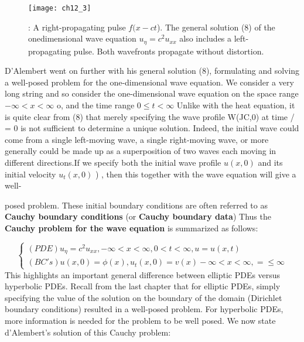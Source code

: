\documentclass[../main.tex]{subfiles}
\begin{document}
\begin{figure}[H]
	\centering
	\texttt{[image: ch12\_3]}
	\caption{\textsf{: A right-propagating pulse $f(x - ct$). The general solution (8) of the onedimensional wave equation $u_\eta = c^2 u_{xx}$
also includes a left-propagating pulse. Both
wavefronts propagate without distortion.}}
	\label{pfig:ch12_3}
\end{figure}

D'Alembert went on further with his general solution (8), formulating and
solving a well-posed problem for the one-dimensional wave equation. We
consider a very long string and so consider the one-dimensional wave equation on
the space range $ -\infty <x< \infty$ o, and the time range $ 0 \leqslant t < \infty $ 
Unlike with the heat
equation, it is quite clear from (8) that merely specifying the wave profile W(JC,0) at
time / = 0 is not sufficient to determine a unique solution. Indeed, the initial wave
could come from a single left-moving wave, a single right-moving wave, or more
generally could be made up as a superposition of two waves each moving in
different directions.If we specify both the initial wave profile $u(x,0)$ and its
initial velocity $u_t(x,0)$ ) , then this together with the wave equation will give a well-


posed problem. These initial boundary conditions are often referred to as \textbf{Cauchy
boundary conditions}  (or \textbf{Cauchy boundary data}) Thus the \textbf{Cauchy problem
for the wave equation} is summarized as follows: 

\begin{equation}
\left\{\begin{array}{ll}
(PDE) u_\eta=c^2u_{xx}, -\infty<x<\infty, 0<t<\infty, u=u(x,t)\\
(BC's) u(x,0)=\phi(x), u_t(x,0)=v(x)-\infty<x<\infty ,=\leqslant \infty
\end{array} \right.
\end{equation}
This highlights an important general difference between elliptic PDEs versus
hyperbolic PDEs. Recall from the last chapter that for elliptic PDEs, simply
specifying the value of the solution on the boundary of the domain (Dirichlet
boundary conditions) resulted in a well-posed problem. For hyperbolic PDEs,
more information is needed for the problem to be well posed. We now state
d'Alembert's solution of this Cauchy problem: 
\\
\\
\end{document}
